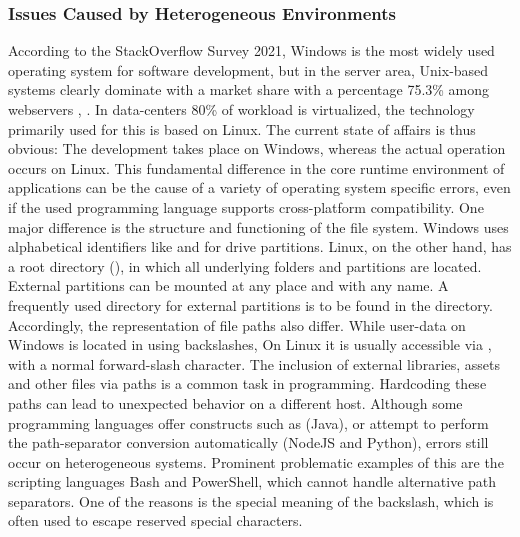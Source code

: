         \subsubsection{Issues Caused by Heterogeneous Environments}\label{sss::hetero}
        According to the StackOverflow Survey 2021, Windows is the most widely used operating system for software development, but in the server area, Unix-based systems clearly dominate with a market share with a percentage 75.3\% among webservers \cite{stackoverflow2021}, \cite{unixusage}.
        In data-centers 80\% of workload is virtualized, the technology primarily used for this is based on Linux. The current state of affairs is thus obvious: The development takes place on Windows, whereas the actual operation occurs on Linux. This fundamental difference in the core runtime environment of applications can be the cause of a variety of operating system specific errors, even if the used programming language supports cross-platform compatibility. One major difference is the structure and functioning of the file system. Windows uses alphabetical identifiers like  and  for drive partitions. Linux, on the other hand, has a root directory (\code{/}), in which all underlying folders and partitions are located. External partitions can be mounted at any place and with any name. A frequently used directory for external partitions is to be found in the  directory. Accordingly, the representation of file paths also differ. While user-data on Windows is located in  using backslashes, On Linux it is usually accessible via , with a normal forward-slash character. The inclusion of external libraries, assets and other files via paths is a common task in programming. Hardcoding these paths can lead to unexpected behavior on a different host. Although some programming languages offer constructs such as  (Java), or attempt to perform the path-separator conversion automatically (NodeJS and Python), errors still occur on heterogeneous systems. Prominent problematic examples of this are the scripting languages Bash and PowerShell, which cannot handle alternative path separators. One of the reasons is the special meaning of the backslash, which is often used to escape reserved special characters.\newline
